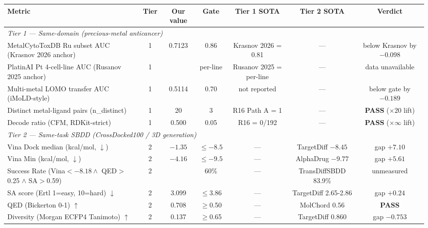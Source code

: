 \begin{table}[ht]
\centering
\small
\setlength{\tabcolsep}{4pt}
\renewcommand{\arraystretch}{1.15}
\begin{tabular}{lcccccc}
\toprule
\textbf{Metric} & \textbf{Tier} & \textbf{Our value} & \textbf{Gate} & \textbf{Tier 1 SOTA} & \textbf{Tier 2 SOTA} & \textbf{Verdict} \\
\midrule
\multicolumn{7}{l}{\emph{Tier 1 — Same-domain (precious-metal anticancer)}} \\
\midrule
MetalCytoToxDB Ru subset AUC (Krasnov 2026 anchor) & 1 & 0.7123 \BELOWGATE{} & 0.86 & Krasnov 2026 = 0.81 & --- & below Krasnov by $-0.098$ \\
PlatinAI Pt 4-cell-line AUC (Rusanov 2025 anchor)    & 1 & \BLOCKED{} \DESIGN{} & per-line & Rusanov 2025 = per-line & --- & data unavailable \\
Multi-metal LOMO transfer AUC (iMoLD-style)          & 1 & 0.5114 \BELOWGATE{} & 0.70 & not reported & --- & below gate by $-0.189$ \\
Distinct metal-ligand pairs (n\_distinct)            & 1 & 20 \MEASURED{} & 3 & R16 Path A = 1 & --- & \textbf{PASS} ($\times 20$ lift) \\
Decode ratio (CFM, RDKit-strict)                     & 1 & 0.500 \MEASURED{} & 0.05 & R16 = 0/192 & --- & \textbf{PASS} ($\times \infty$ lift) \\
\midrule
\multicolumn{7}{l}{\emph{Tier 2 — Same-task SBDD (CrossDocked100 / 3D generation)}} \\
\midrule
Vina Dock median (kcal/mol, $\downarrow$)            & 2 & $-1.35$ \BELOWGATE{} & $\leq-8.5$ & --- & TargetDiff $-8.45$ & gap $+7.10$ \\
Vina Min (kcal/mol, $\downarrow$)                    & 2 & $-4.16$ \BELOWGATE{} & $\leq-9.5$ & --- & AlphaDrug $-9.77$ & gap $+5.61$ \\
Success Rate (Vina$<-8.18 \wedge$ QED$>$0.25 $\wedge$ SA$>$0.59) & 2 & \DESIGN{} & 60\% & --- & TransDiffSBDD 83.9\% & unmeasured \\
SA score (Ertl 1=easy, 10=hard) $\downarrow$         & 2 & 3.099 \MEASURED{} & $\leq$3.86 & --- & TargetDiff 2.65-2.86 & gap $+0.24$ \\
QED (Bickerton 0-1) $\uparrow$                       & 2 & 0.708 \MEASURED{} & $\geq$0.50 & --- & MolChord 0.56 & \textbf{PASS} \\
Diversity (Morgan ECFP4 Tanimoto) $\uparrow$         & 2 & 0.137 \BELOWGATE{} & $\geq$0.65 & --- & TargetDiff 0.860 & gap $-0.753$ \\

\end{tabular}
\end{table}
